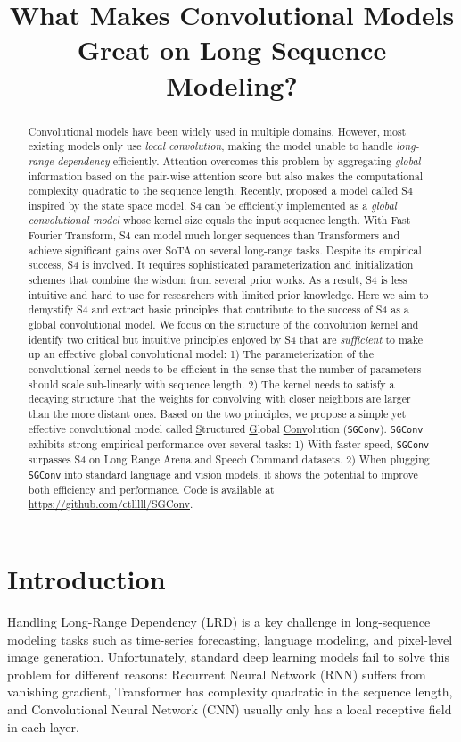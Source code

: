\title{What Makes Convolutional Models Great on Long Sequence Modeling?}

\begin{abstract}
Convolutional models have been widely used in multiple domains. However, most existing models only use \emph{local convolution}, making the model unable to handle \emph{long-range dependency} efficiently. Attention overcomes this problem by aggregating \emph{global} information based on the pair-wise attention score but also makes the computational complexity quadratic to the sequence length. Recently, \citet{gu2021efficiently} proposed a model called S4 inspired by the state space model. S4 can be efficiently implemented as a \emph{global convolutional model} whose kernel size equals the input sequence length. With Fast Fourier Transform, S4 can model much longer sequences than Transformers and achieve significant gains over SoTA on several long-range tasks. Despite its empirical success, S4 is involved. It requires sophisticated parameterization and initialization schemes that combine the wisdom from several prior works. As a result, S4 is less intuitive and hard to use for researchers with limited prior knowledge. Here we aim to demystify S4 and extract basic principles that contribute to the success of S4 as a global convolutional model. We focus on the structure of the convolution kernel and identify two critical but intuitive principles enjoyed by S4 that are \emph{sufficient} to make up an effective global convolutional model: 1) The parameterization of the convolutional kernel needs to be efficient in the sense that the number of parameters should scale sub-linearly with sequence length. 2) The kernel needs to satisfy a decaying structure that the weights for convolving with closer neighbors are larger than the more distant ones. Based on the two principles, we propose a simple yet effective convolutional model called \underline{S}tructured \underline{G}lobal \underline{Conv}olution (\texttt{SGConv}). \texttt{SGConv} exhibits strong empirical performance over several tasks: 1) With faster speed, \texttt{SGConv} surpasses S4 on Long Range Arena and Speech Command datasets. 2) When plugging \texttt{SGConv} into standard language and vision models, it shows the potential to improve both efficiency and performance. Code is available at \url{https://github.com/ctlllll/SGConv}.
\end{abstract}

\section{Introduction}\label{sec: intro} Handling Long-Range Dependency (LRD) is a key challenge in long-sequence modeling tasks such as time-series forecasting, language modeling, and pixel-level image generation. Unfortunately, standard deep learning models fail to solve this problem for different reasons: Recurrent Neural Network (RNN) suffers from vanishing gradient, Transformer has complexity quadratic in the sequence length, and Convolutional Neural Network (CNN) usually only has a local receptive field in each layer.

